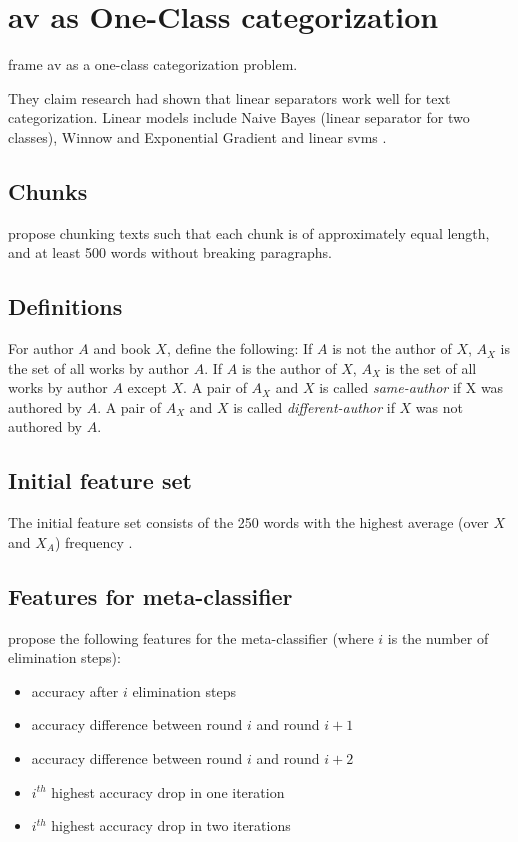 \section{\ac{av} as One-Class categorization}
\label{sec:av_one_class}





\citet{koppel_authorship_2004} frame \ac{av} as a one-class categorization problem.

They claim research had shown that linear separators work well for text categorization.
Linear models include Naive Bayes (linear separator for two classes), 
Winnow and Exponential Gradient and linear \acp{svm} \citep{koppel_authorship_2004}. 


\subsection{Chunks}
\citet{koppel_authorship_2004} propose chunking texts such that each chunk is of approximately equal length, 
and at least 500 words without breaking paragraphs. 

\subsection{Definitions}
For author $A$ and book $X$, \citet{koppel_authorship_2004} define the following:
If $A$ is not the author of $X$, $A_X$ is the set of all works by author $A$.
If $A$ is the author of $X$, $A_X$ is the set of all works by author $A$ except $X$.
A pair of $A_X$ and $X$ is called \emph{same-author} if X was authored by $A$.
A pair of $A_X$ and $X$ is called \emph{different-author} if $X$ was not authored by $A$.

\subsection{Initial feature set}
The initial feature set consists of the 250 words with the highest average (over $X$ and $X_A$) frequency \citep{koppel_authorship_2004}.

\subsection{Features for meta-classifier}
\citet{koppel_authorship_2004} propose the following features for the meta-classifier 
(where $i$ is the number of elimination steps):
\begin{itemize}
    \item accuracy after $i$ elimination steps
    \item accuracy difference between round $i$ and round $i+1$
    \item accuracy difference between round $i$ and round $i+2$
    \item $i^{th}$ highest accuracy drop in one iteration
    \item $i^{th}$ highest accuracy drop in two iterations
\end{itemize}

